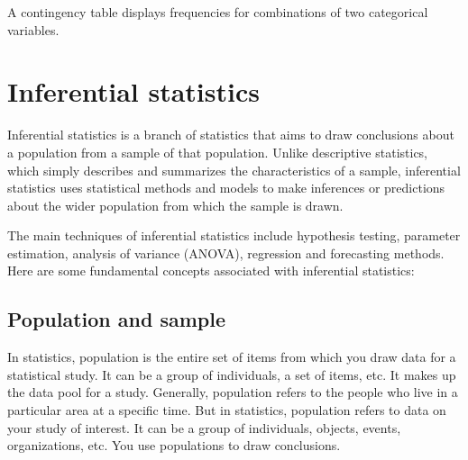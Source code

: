 \documentclass[
]{book}
\newenvironment{Shaded}{\begin{snugshade}}{\end{snugshade}}
\newcommand{\AttributeTok}[1]{\textcolor[rgb]{0.13,0.29,0.53}{#1}}
\newcommand{\CommentTok}[1]{\textcolor[rgb]{0.56,0.35,0.01}{\textit{#1}}}
\newcommand{\FunctionTok}[1]{\textcolor[rgb]{0.13,0.29,0.53}{\textbf{#1}}}
\newcommand{\NormalTok}[1]{#1}
\newcommand{\SpecialCharTok}[1]{\textcolor[rgb]{0.81,0.36,0.00}{\textbf{#1}}}
\newcommand{\StringTok}[1]{\textcolor[rgb]{0.31,0.60,0.02}{#1}}
\begin{document}
A contingency table displays frequencies for combinations of two categorical variables.

\begin{Shaded}
\end{Shaded}

\hypertarget{inferential-statistics}{%
\chapter{Inferential statistics}\label{inferential-statistics}}

Inferential statistics is a branch of statistics that aims to draw conclusions about a population from a sample of that population. Unlike descriptive statistics, which simply describes and summarizes the characteristics of a sample, inferential statistics uses statistical methods and models to make inferences or predictions about the wider population from which the sample is drawn.

The main techniques of inferential statistics include hypothesis testing, parameter estimation, analysis of variance (ANOVA), regression and forecasting methods. Here are some fundamental concepts associated with inferential statistics:

\hypertarget{population-and-sample}{%
\section{Population and sample}\label{population-and-sample}}

In statistics, population is the entire set of items from which you draw data for a statistical study. It can be a group of individuals, a set of items, etc. It makes up the data pool for a study. Generally, population refers to the people who live in a particular area at a specific time. But in statistics, population refers to data on your study of interest. It can be a group of individuals, objects, events, organizations, etc. You use populations to draw conclusions.
\end{document}
